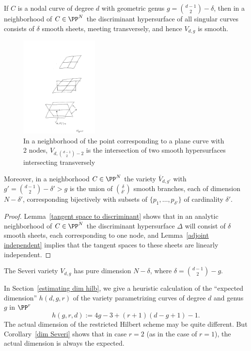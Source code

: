 \begin{corollary}\label{local geometry of Severi}
If $C$ is a nodal curve of degree $d$ with geometric genus $g = \binom{d-1}{2}-\delta$, then in a neighborhood of $C\in \PP^N$
the discriminant hypersurface of all singular curves consists of $\delta$ smooth sheets, meeting transversely, and hence
$V_{d,g}$ is smooth. 

\begin{figure}
 \caption{In a neighborhood of the point corresponding to a plane curve with 2 nodes, $V_{d, \binom{d-1}{2}-2}$ is the intersection of two smooth hypersurfaces intersecting transversely}
\centerline {\includegraphics[height=2in]{"Fig6.3.pdf"}}
\end{figure}

Moreover, in a neighborhood  $C \in \PP^N$ 
the variety $\overline V_{d,g'}$ with $g' =  \binom{d-1}{2}-\delta' > g$ is the union of $\binom{\delta}{\delta'}$ smooth branches, each of dimension $N - \delta'$, corresponding bijectively with subsets of $\{p_1,\dots,p_{\delta'}\}$ of cardinality $\delta'$.
\end{corollary}
\begin{proof}
Lemma~\ref{tangent space to discriminant} shows that in an analytic neighborhood of $C\in \PP^N$ the discriminant hypersurface $\Delta$ will consist of $\delta$ smooth sheets, each corresponding to one node, and Lemma~\ref{adjoint independent} implies that the tangent spaces to these sheets are linearly independent. 
\end{proof}


\begin{corollary}\label{dim Severi}
The  Severi variety $V_{d,g}$ has pure dimension $N - \delta$, where $\delta = \binom{d-1}{2} - g$.
\end{corollary}

In Section~\ref{estimating dim hilb}, we give a heuristic calculation of the ``expected dimension'' $h(d,g,r)$ of the variety parametrizing curves of degree $d$ and genus $g$ in $\PP^r$
$$
h(g,r,d) := 4g-3 + (r+1)(d-g+1) - 1.
$$
The actual dimension of the restricted Hilbert scheme may be quite different. But  Corollary~\ref{dim Severi} shows that in case $r=2$ (as in the case of $r=1$), the actual dimension is always the expected.



